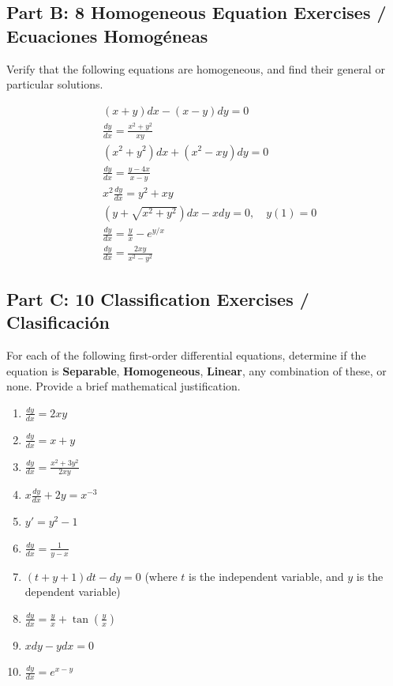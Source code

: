 \documentclass[11pt,letterpaper]{article}
\begin{document}
\subsection*{Part B: 8 Homogeneous Equation Exercises / Ecuaciones Homogéneas}
Verify that the following equations are homogeneous, and find their general or particular solutions.

\begin{align}
    & (x+y)dx - (x-y)dy = 0 \label{eq:hom1} \\
    & \frac{dy}{dx} = \frac{x^2 + y^2}{xy} \label{eq:hom2} \\
    & (x^2+y^2)dx + (x^2-xy)dy = 0 \label{eq:hom3} \\
    & \frac{dy}{dx} = \frac{y-4x}{x-y} \label{eq:hom4} \\
    & x^2 \frac{dy}{dx} = y^2 + xy \label{eq:hom5} \\
    & (y + \sqrt{x^2+y^2})dx - x dy = 0, \quad y(1) = 0 \label{eq:hom6} \\
    & \frac{dy}{dx} = \frac{y}{x} - e^{y/x} \label{eq:hom7} \\
    & \frac{dy}{dx} = \frac{2xy}{x^2 - y^2} \label{eq:hom8}
\end{align}

\subsection*{Part C: 10 Classification Exercises / Clasificación}
For each of the following first-order differential equations, determine if the equation is \textbf{Separable}, \textbf{Homogeneous}, \textbf{Linear}, any combination of these, or none. Provide a brief mathematical justification.

\begin{enumerate}[label=\textbf{\arabic*.}]
    \item $\frac{dy}{dx} = 2xy$
    \item $\frac{dy}{dx} = x + y$
    \item $\frac{dy}{dx} = \frac{x^2 + 3y^2}{2xy}$
    \item $x \frac{dy}{dx} + 2y = x^{-3}$
    \item $y' = y^2 - 1$
    \item $\frac{dy}{dx} = \frac{1}{y-x}$
    \item $(t+y+1)dt - dy = 0$ (where $t$ is the independent variable, and $y$ is the dependent variable)
    \item $\frac{dy}{dx} = \frac{y}{x} + \tan\left(\frac{y}{x}\right)$
    \item $x dy - y dx = 0$
    \item $\frac{dy}{dx} = e^{x-y}$
\end{enumerate}
\end{document}
